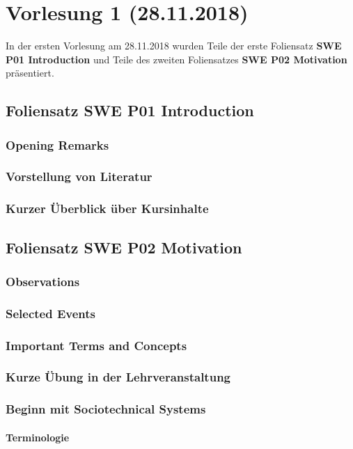 \documentclass[a4paper,12pt,twoside]{scrreprt}
\begin{document}
\chapter{Vorlesung 1 (28.11.2018)}
In der ersten Vorlesung am 28.11.2018 wurden Teile der erste Foliensatz \textbf{SWE P01 Introduction} und Teile des zweiten Foliensatzes \textbf{SWE P02 Motivation} präsentiert. 
  \section{Foliensatz SWE P01 Introduction}
    \subsection{Opening Remarks}
    \subsection{Vorstellung von Literatur}
    \subsection{Kurzer Überblick über Kursinhalte}

  \section{Foliensatz SWE P02 Motivation}
    \subsection{Observations}
    \subsection{Selected Events}
    \subsection{Important Terms and Concepts}
    \subsection{Kurze Übung in der Lehrveranstaltung}
    \subsection{Beginn mit Sociotechnical Systems}
      \subsubsection{Terminologie}
\end{document}
